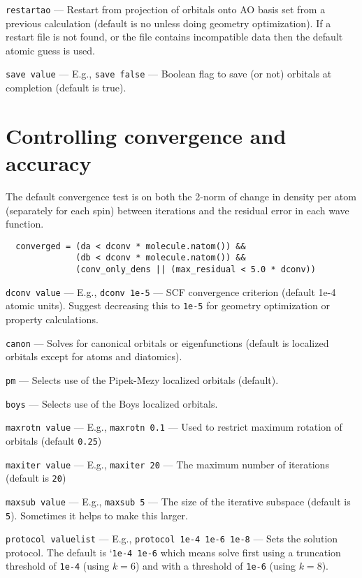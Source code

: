\documentclass[letterpaper]{book}
\begin{document}
{\tt restartao} --- Restart from projection of orbitals onto AO basis
set from a previous calculation (default is no unless doing geometry
optimization).  If a restart file is not found, or the file contains
incompatible data then the default atomic guess is used.

{\tt save value} --- E.g., {\tt save false} --- Boolean flag to save (or not) orbitals at completion (default is true).

\section{Controlling convergence and accuracy}

The default convergence test is on both the 2-norm of change in density per atom (separately for each spin) between iterations and the residual error in each wave function.

\begin{verbatim}
  converged = (da < dconv * molecule.natom()) && 
              (db < dconv * molecule.natom()) &&
              (conv_only_dens || (max_residual < 5.0 * dconv))
\end{verbatim}

{\tt dconv value} --- E.g., {\tt dconv 1e-5} --- SCF convergence criterion (default 1e-4 atomic units).  Suggest decreasing this to {\tt 1e-5} for geometry optimization or property calculations.

{\tt canon} --- Solves for canonical orbitals or eigenfunctions (default is localized orbitals except for atoms and diatomics).

{\tt pm} --- Selects use of the Pipek-Mezy localized orbitals (default).

{\tt boys} --- Selects use of the Boys localized orbitals.

{\tt maxrotn value} --- E.g., {\tt maxrotn 0.1} --- Used to restrict maximum rotation of orbitals (default {\tt 0.25})

{\tt maxiter value} --- E.g., {\tt maxiter 20} --- The maximum number of iterations (default is {\tt 20})

{\tt maxsub value} --- E.g., {\tt maxsub 5} --- The size of the iterative subspace (default is {\tt 5}).  Sometimes it helps to make this larger.

{\tt protocol valuelist} --- E.g., {\tt protocol 1e-4 1e-6 1e-8} --- Sets the solution protocol.  The default is `{\tt 1e-4 1e-6} which means solve first using a truncation threshold of {\tt 1e-4} (using $k=6$) and with a threshold of {\tt 1e-6} (using $k=8$).
\end{document}
